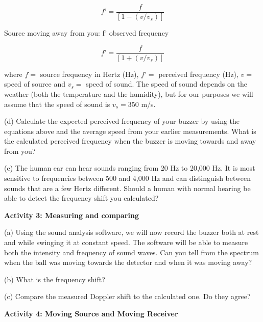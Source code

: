 \begin{equation}
f’ =\frac{f}{[1 - (v/v_{s})]}
\end{equation}

Source moving away from you: f’ observed frequency

\begin{equation}
	f’ =\frac{f}{[1 + (v/v_{s})]}
\end{equation}

where $f =$ source frequency in Hertz (Hz), $f’ =$ perceived frequency (Hz), $v =$ speed of source
and $v_{s} =$ speed of sound. The speed of sound depends on the weather (both the temperature and the humidity), but for our purposes we will assume that the speed of sound is $v_{s} = 350$ m/s.

(d) Calculate the expected perceived frequency of your buzzer by using the equations above and the average speed from your earlier measurements. What is the calculated perceived frequency when the buzzer is moving towards and away from you?
\answerspace{30mm}

(e) The human ear can hear sounds ranging from 20 Hz to 20,000 Hz. It is most sensitive to frequencies between 500 and 4,000 Hz and can distinguish between sounds that are a few Hertz different. Should a human with normal hearing be able to detect the frequency shift you calculated?
\answerspace{30mm}

\textbf{Activity 3: Measuring and comparing}

(a) Using the sound analysis software, we will now record the buzzer both at rest and while swinging it at constant speed. The software will be able to measure both the intensity and frequency of sound waves. Can you tell from the spectrum when the ball was moving towards the detector and when it was moving away?
\answerspace{32mm}

(b) What is the frequency shift?
\answerspace{32mm}

(c) Compare the measured Doppler shift to the calculated one.  Do they agree?
\answerspace{32mm}


\pagebreak
\textbf{Activity 4: Moving Source and Moving Receiver}

